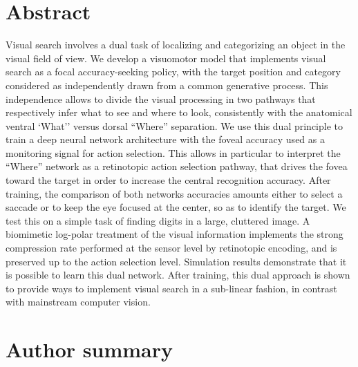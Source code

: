 \documentclass[10pt,a4paper]{article}
\begin{document}
\section*{Abstract}
Visual search involves a dual task of localizing and categorizing an object in the visual field of view. We develop a visuomotor model that implements visual search as a focal accuracy-seeking policy, with the target position and category considered as independently drawn from a common generative process. This independence allows to divide the visual processing in two pathways that respectively infer what to see and where to look, consistently with the anatomical ventral `What'' versus dorsal ``Where'' separation. We use this dual principle to train a deep neural network architecture with the foveal accuracy used as a monitoring signal for action selection. This allows in particular to interpret the ``Where'' network as a retinotopic action selection pathway, that drives the fovea toward the target in order to increase the central recognition accuracy. After training, the comparison of both networks accuracies amounts either to select a saccade or to keep the eye focused at the center, so as to identify the target. We test this on a simple task of finding digits in a large, cluttered image. A biomimetic log-polar treatment of the visual information implements the strong compression rate performed at the sensor level by retinotopic encoding, and is preserved up to the action selection level. Simulation results demonstrate that it is possible to learn this dual network. After training, this dual approach is shown to provide ways to implement visual search in a sub-linear fashion, in contrast with mainstream computer vision.
\section*{Author summary}
\end{document}
